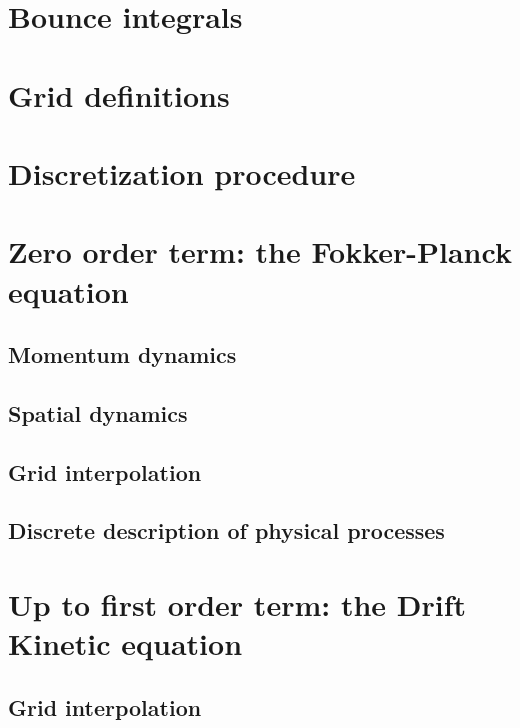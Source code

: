 \documentclass[11pt,a4paper]{report}
\begin{document}
	\section{Bounce integrals}
	

	\section{Grid definitions}
	

	\section{Discretization procedure}
	

	\section{Zero order term: the Fokker-Planck equation}

		\subsection{Momentum dynamics}
		

		\subsection{Spatial dynamics}
		

		\subsection{Grid interpolation}
		

		\subsection{Discrete description of physical processes}
		

	\section{Up to first order term: the Drift Kinetic equation}

		\subsection{Grid interpolation}
		
\end{document}
